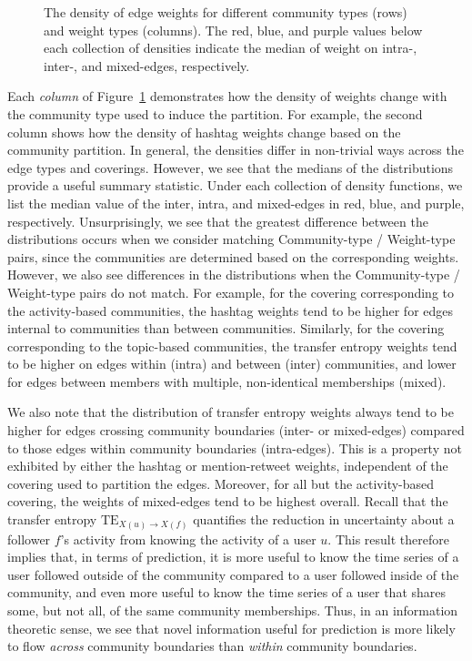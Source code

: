 \begin{figure}[!h]
	\caption{The density of edge weights for different community types (rows) and weight types (columns). The red,  blue, and purple values below each collection of densities indicate the median of weight on intra-, inter-, and mixed-edges, respectively.}
	\label{Fig-distributions_by_types}
\end{figure}

Each \emph{column} of Figure~\ref{Fig-distributions_by_types} demonstrates how the density of weights change with the community type used to induce the partition. For example, the second column shows how the density of hashtag weights change based on the community partition. In general, the densities differ in non-trivial ways across the edge types and coverings. However, we see that the medians of the distributions provide a useful summary statistic. Under each collection of density functions, we list the median value of the inter, intra, and mixed-edges in red, blue, and purple, respectively. Unsurprisingly, we see that the greatest difference between the distributions occurs when we consider matching Community-type / Weight-type pairs, since the communities are determined based on the corresponding weights. However, we also see differences in the distributions when the Community-type / Weight-type pairs do not match. For example, for the covering corresponding to the activity-based communities, the hashtag weights tend to be higher for edges internal to communities than between communities. Similarly, for the covering corresponding to the topic-based communities, the transfer entropy weights tend to be higher on edges within (intra) and between (inter) communities, and lower for edges between members with multiple, non-identical memberships (mixed).

We also note that the distribution of transfer entropy weights always tend to be higher for edges crossing community boundaries (inter- or mixed-edges) compared to those edges within community boundaries (intra-edges). This is a property not exhibited by either the hashtag or mention-retweet weights, independent of the covering used to partition the edges. Moreover, for all but the activity-based covering, the weights of mixed-edges tend to be highest overall.  Recall that the transfer entropy $\text{TE}_{X(u) \to X(f)}$ quantifies the reduction in uncertainty about a follower $f$'s activity from knowing the activity of a user $u$. This result therefore implies that, in terms of prediction, it is more useful to know the time series of a user followed outside of the community compared to a user followed inside of the community, and even more useful to know the time series of a user that shares some, but not all, of the same community memberships. Thus, in an information theoretic sense, we see that novel information useful for prediction is more likely to flow \emph{across} community boundaries than \emph{within} community boundaries.

